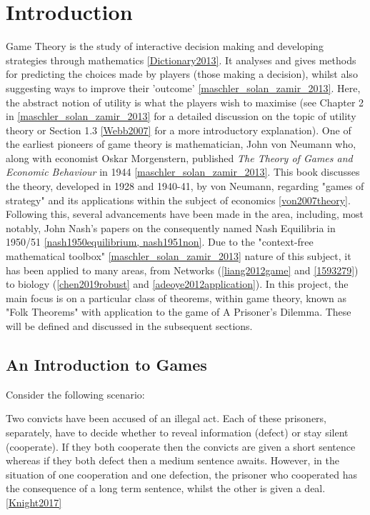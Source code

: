 \chapter{Introduction}

Game Theory is the study of interactive decision making and developing
strategies through mathematics \ref{Dictionary2013}. It analyses and gives
methods for predicting the choices made by players (those making a decision),
whilst also suggesting ways to improve their 'outcome'
\ref{maschler_solan_zamir_2013}. Here, the abstract notion of utility is what
the players wish to maximise (see Chapter 2 in \ref{maschler_solan_zamir_2013}
for a detailed discussion on the topic of utility theory or Section 1.3
\ref{Webb2007} for a more introductory explanation). One of the earliest
pioneers of game theory is mathematician, John von Neumann who, along with
economist Oskar Morgenstern, published \textit{The Theory of Games and Economic
Behaviour} in 1944 \ref{maschler_solan_zamir_2013}. This book discusses the
theory, developed in 1928 and 1940-41, by von Neumann, regarding "games of
strategy" and its applications within the subject of economics
\ref{von2007theory}. Following this, several advancements have been made in the
area, including, most notably, John Nash's papers on the consequently named Nash
Equilibria in 1950/51 \ref{nash1950equilibrium, nash1951non}. Due to the
"context-free mathematical toolbox" \ref{maschler_solan_zamir_2013} nature of
this subject, it has been applied to many areas, from Networks
(\ref{liang2012game} and \ref{1593279}) to biology (\ref{chen2019robust} and
\ref{adeoye2012application}). In this project, the main focus is on a particular
class of theorems, within game theory, known as "Folk Theorems" with application
to the game of A Prisoner's Dilemma. These will be defined and discussed in the
subsequent sections.

\section{An Introduction to Games}
Consider the following scenario:

\begin{center}
    Two convicts have been accused of an illegal act. Each of these prisoners,
    separately, have to decide whether to reveal information (defect) or stay
    silent (cooperate). If they both cooperate then the convicts are given a
    short sentence whereas if they both defect then a medium sentence awaits.
    However, in the situation of one cooperation and one defection, the prisoner
    who cooperated has the consequence of a long term sentence, whilst the other
    is given a deal. \ref{Knight2017}
\end{center}

